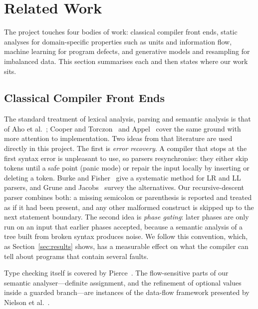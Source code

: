 \documentclass[conference]{IEEEtran}
\begin{document}
\section{Related Work}\label{sec:related}

The project touches four bodies of work: classical compiler front ends, static analyses for domain-specific
properties such as units and information flow, machine learning for program defects, and generative models and
resampling for imbalanced data. This section summarises each and then states where our work sits.

\subsection{Classical Compiler Front Ends}

The standard treatment of lexical analysis, parsing and semantic analysis is that of Aho et
al.~\cite{aho2006}; Cooper and Torczon~\cite{cooper2007} and Appel~\cite{appel1998} cover the same ground with
more attention to implementation. Two ideas from that literature are used directly in this project. The first is
\emph{error recovery}. A compiler that stops at the first syntax error is unpleasant to use, so parsers
resynchronise: they either skip tokens until a safe point (panic mode) or repair the input locally by inserting
or deleting a token. Burke and Fisher~\cite{burke1987} give a systematic method for LR and LL parsers, and Grune
and Jacobs~\cite{grune2008} survey the alternatives. Our recursive-descent parser combines both: a missing
semicolon or parenthesis is reported and treated as if it had been present, and any other malformed construct is
skipped up to the next statement boundary. The second idea is \emph{phase gating}: later phases are only run on
an input that earlier phases accepted, because a semantic analysis of a tree built from broken syntax produces
noise. We follow this convention, which, as Section~\ref{sec:results} shows, has a measurable effect on what the compiler can
tell about programs that contain several faults.

Type checking itself is covered by Pierce~\cite{pierce2002}. The flow-sensitive parts of our semantic
analyser---definite assignment, and the refinement of optional values inside a guarded branch---are instances of
the data-flow framework presented by Nielson et al.~\cite{nielson1999}.
\end{document}
